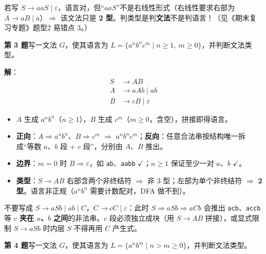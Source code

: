 \documentclass[12pt,a4paper,fontset=windows]{ctexart}
\newcommand{\ok}{\ensuremath{\checkmark}}
\newcommand{\imp}{\ensuremath{\Rightarrow}}
\begin{document}
\begin{warnbox}
若写 $S \to aaS \mid \varepsilon$，语言对，但``$aaS$''不是右线性形式（右线性要求右部为 $A \to aB \mid a$）\imp{} 该文法只是 \textbf{2 型}。判类型是判\textbf{文法}不是判语言！（见《期末复习专题》题型2 易错点 3。）
\end{warnbox}

\begin{qbox}
{\large\bfseries 第 3 题}\quad 写一文法 $G$，使其语言为 $L=\{a^n b^n c^m \mid n \ge 1,\ m \ge 0\}$，并判断文法类型。
\end{qbox}

\textbf{解}：
\[
\begin{aligned}
S &\to AB\\
A &\to aAb \mid ab\\
B &\to cB \mid \varepsilon
\end{aligned}
\]
\begin{itemize}
\item $A$ 生成 $a^n b^n$（$n \ge 1$），$B$ 生成 $c^m$（$m \ge 0$，含空），拼接即得语言。
\item \textbf{正向}：$A \Rightarrow a^n b^n$、$B \Rightarrow c^m$ \imp{} $a^n b^n c^m$；\textbf{反向}：任意合法串按结构唯一拆成``等数 $a$、$b$ 段 + $c$ 段''，分别由 $A$、$B$ 推出。
\item \textbf{边界}：$m = 0$ 时 $B \Rightarrow \varepsilon$，如 \texttt{ab}、\texttt{aabb} \ok；$n \ge 1$ 保证至少一对 $a$、$b$ \ok。
\item \textbf{类型}：$S \to AB$ 右部含两个非终结符 \imp{} 非 3 型；左部为单个非终结符 \imp{} \textbf{2 型}。语言非正规（$a^n b^n$ 需要计数配对，DFA 做不到）。
\end{itemize}

\begin{warnbox}
不要写成 $S \to aSb \mid ab \mid C$，$C \to cC \mid \varepsilon$：此时 $S \Rightarrow aSb \Rightarrow aCb$ 会推出 \texttt{acb}、\texttt{accb} 等 \textbf{$c$ 夹在 $a$、$b$ 之间}的非法串。$c$ 段必须独立成块（用 $S \to AB$ 拼接），或显式限制 $S \to aSb$ 时内层 $S$ 不得再用 $C$ 产生式。
\end{warnbox}

\begin{qbox}
{\large\bfseries 第 4 题}\quad 写一文法 $G$，使其语言为 $L=\{a^n b^m \mid n > m \ge 0\}$，并判断文法类型。
\end{qbox}
\end{document}
